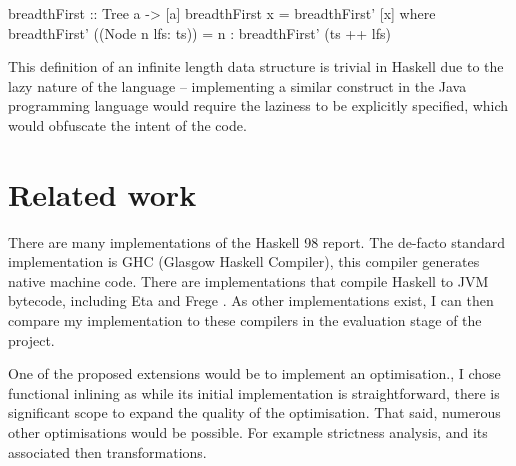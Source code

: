 \documentclass[float=false, crop=false]{standalone}
\begin{document}
\begin{minipage}{\linewidth}
\begin{HaskellLst}
breadthFirst :: Tree a -> [a]
breadthFirst x = breadthFirst' [x]
  where
    breadthFirst' ((Node n lfs: ts)) =
      n : breadthFirst' (ts ++ lfs)
\end{HaskellLst}
\end{minipage}
This definition of an infinite length data structure is trivial in 
Haskell due to the lazy nature of the language -- implementing
a similar construct in the Java programming language would 
require the laziness to be explicitly specified, which 
would obfuscate the intent of the code. 





  

\section{Related work}

There are many implementations of the Haskell 98 report.
The de-facto standard implementation is GHC \cite{ghc} (Glasgow Haskell
Compiler), this compiler generates native machine code. There
are implementations that compile Haskell to JVM bytecode, including Eta \cite{eta} and Frege \cite{frege}. 
As other implementations exist, I can then 
compare my implementation to these compilers in the evaluation stage
of the project. 

One of the proposed extensions would be to implement an optimisation.,
I chose functional inlining as while its initial implementation is straightforward, 
there is significant scope to expand the quality of the optimisation. 
That said, numerous other optimisations would be possible. 
For example strictness analysis, and its associated then transformations. 
\end{document}

